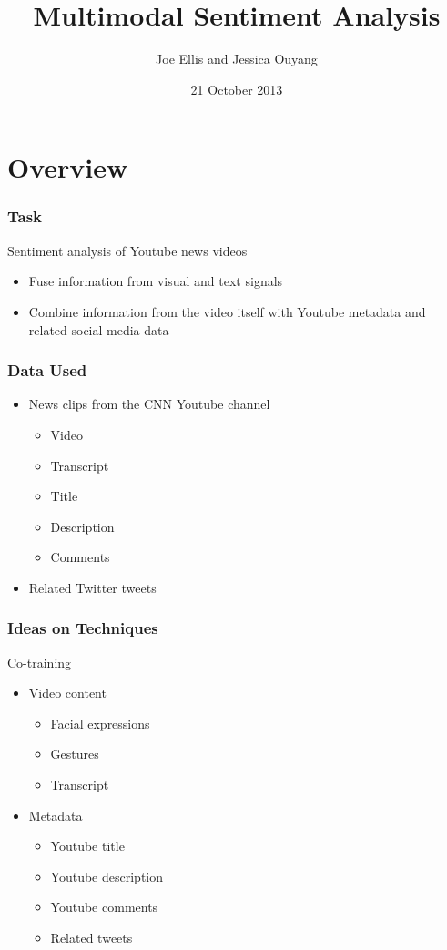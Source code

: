 \documentclass[brown]{beamer}
\title{Multimodal Sentiment Analysis}
\author{Joe Ellis and Jessica Ouyang}
\institute{Columbia University}
\date{21 October 2013}
\begin{document}
\begin{frame}
  \titlepage
\end{frame}

\section{Overview}

\begin{frame}
  \frametitle{Task}
  Sentiment analysis of Youtube news videos
  \begin{itemize}
  \item Fuse information from visual and text signals
  \item Combine information from the video itself with Youtube metadata and related social media data
  \end{itemize}
\end{frame}

\begin{frame}
  \frametitle{Data Used}
  \begin{itemize}
  \item News clips from the CNN Youtube channel
    \begin{itemize}
    \item Video
    \item Transcript
    \item Title
    \item Description
    \item Comments
    \end{itemize}
  \item Related Twitter tweets
  \end{itemize}
\end{frame}

\begin{frame}
  \frametitle{Ideas on Techniques}
  Co-training
  \begin{itemize}
  \item Video content
    \begin{itemize}
    \item Facial expressions
    \item Gestures
    \item Transcript
    \end{itemize}
  \item Metadata
    \begin{itemize}
      \item Youtube title
      \item Youtube description
      \item Youtube comments
      \item Related tweets
    \end{itemize}
  \end{itemize}
\end{frame}
\end{document}
